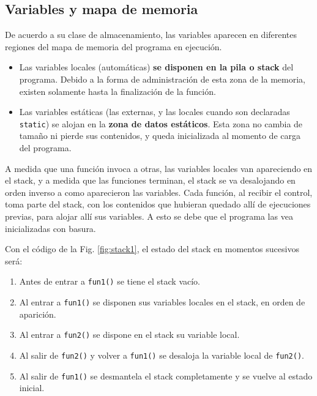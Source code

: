 \subsection{Variables y mapa de memoria}

De acuerdo a su clase de almacenamiento, las variables aparecen en diferentes regiones del mapa de
memoria del programa en ejecución.
\begin{itemize}
	\item Las variables locales (automáticas) \textbf{se disponen en la pila o stack} del programa.
Debido a la forma de administración de esta zona de la
memoria, existen solamente hasta la finalización de la
función.
\item Las variables estáticas (las externas, y las locales cuando
son declaradas \lstinline{static}) se alojan en la \textbf{zona de datos
estáticos}. Esta zona no cambia de tamaño ni pierde sus
contenidos, y queda inicializada al momento de carga del
programa.
\end{itemize}

A medida que una función invoca a otras, las variables locales van apareciendo en el stack, y a medida
que las funciones terminan, el stack se va desalojando en orden inverso a como aparecieron las
variables. Cada función, al recibir el control, toma parte del stack, con los contenidos que hubieran
quedado allí de ejecuciones previas, para alojar allí sus variables. A esto se debe que el programa las
vea inicializadas con basura.


\begin{ejemplo}
Con el código de la Fig. \ref{fig:stack1}, el estado del stack en momentos sucesivos será: 
\begin{enumerate}
\item Antes de entrar a \lstinline{fun1()} se tiene el stack vacío.
\item Al entrar a \lstinline{fun1()} se disponen sus variables locales en el stack, en orden de aparición.
\item Al entrar a \lstinline{fun2()} se dispone en el stack su variable local.
\item Al salir de \lstinline{fun2()} y volver a \lstinline{fun1()} se desaloja la variable local de \lstinline{fun2()}.
\item Al salir de \lstinline{fun1()} se desmantela el stack completamente y se vuelve al estado inicial.
\end{enumerate}
\end{ejemplo}

